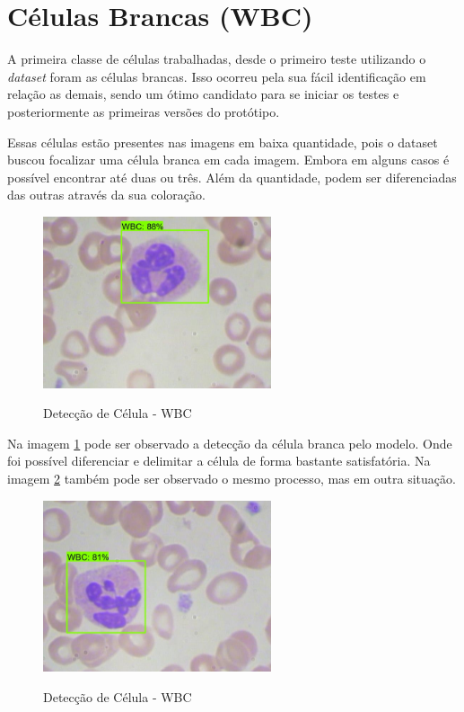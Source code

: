 \section{Células Brancas (WBC)}
A primeira classe de células trabalhadas, desde o primeiro teste utilizando o \emph{dataset} foram as células brancas. Isso ocorreu pela sua fácil identificação em relação as demais, sendo um ótimo candidato para se iniciar os testes e posteriormente as primeiras versões do protótipo.

Essas células estão presentes nas imagens em baixa quantidade, pois o dataset buscou focalizar uma célula branca em cada imagem. Embora em alguns casos é possível encontrar até duas ou três. Além da quantidade, podem ser diferenciadas das outras através da sua coloração.

\begin{figure}[!htb]
	\centering
	\caption{Detecção de Célula - WBC}
	\includegraphics[width=0.60\textwidth]{img/predict_wbc.jpeg}
	\label{fig:predict_wbc}
\end{figure}

Na imagem \ref{fig:predict_wbc} pode ser observado a detecção da célula branca pelo modelo. Onde foi possível diferenciar e delimitar a célula de forma bastante satisfatória. Na imagem \ref{fig:predict_wbc_2} também pode ser observado o mesmo processo, mas em outra situação.

\begin{figure}[!htb]
	\centering
	\caption{Detecção de Célula - WBC}
	\includegraphics[width=0.60\textwidth]{img/predict_wbc_2.jpeg}
	\label{fig:predict_wbc_2}
\end{figure}

